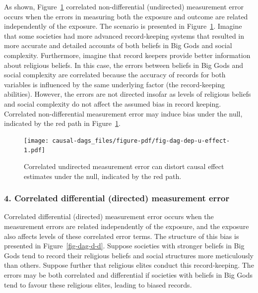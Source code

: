 \documentclass[
  singlecolumn]{report}
\begin{document}
As shown, Figure~\ref{fig-dag-dep-u-effect} correlated non-differential
(undirected) measurement error occurs when the errors in measuring both
the exposure and outcome are related independently of the exposure. The
scenario is presented in Figure~\ref{fig-dag-dep-u-effect}. Imagine that
some societies had more advanced record-keeping systems that resulted in
more accurate and detailed accounts of both beliefs in Big Gods and
social complexity. Furthermore, imagine that record keepers provide
better information about religious beliefs. In this case, the errors
between beliefs in Big Gods and social complexity are correlated because
the accuracy of records for both variables is influenced by the same
underlying factor (the record-keeping abilities). However, the errors
are not directed insofar as levels of religious beliefs and social
complexity do not affect the assumed bias in record keeping. Correlated
non-differential measurement error may induce bias under the null,
indicated by the red path in Figure~\ref{fig-dag-dep-u-effect}.

\begin{figure}

{\centering \texttt{[image: causal-dags\_files/figure-pdf/fig-dag-dep-u-effect-1.pdf]}

}

\caption{\label{fig-dag-dep-u-effect}Correlated undirected measurement
error can distort causal effect estimates under the null, indicated by
the red path.}

\end{figure}

\hypertarget{correlated-differential-directed-measurement-error}{%
\subsubsection{\texorpdfstring{4. \textbf{Correlated differential
(directed) measurement
error}}{4. Correlated differential (directed) measurement error}}\label{correlated-differential-directed-measurement-error}}

Correlated differential (directed) measurement error occurs when the
measurement errors are related independently of the exposure, and the
exposure also affects levels of these correlated error terms. The
structure of this bias is presented in Figure~\ref{fig-dag-d-d}. Suppose
societies with stronger beliefs in Big Gods tend to record their
religious beliefs and social structures more meticulously than others.
Suppose further that religious elites conduct this record-keeping. The
errors may be both correlated and differential if societies with beliefs
in Big Gods tend to favour these religious elites, leading to biased
records.
\end{document}
